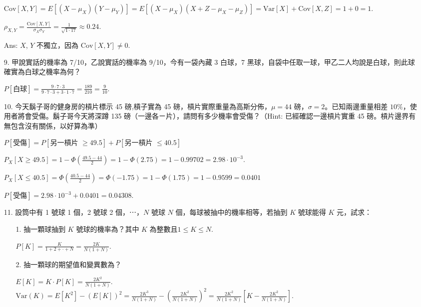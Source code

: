 \documentclass{article}
\begin{document}
\begin{enumerate}
    $\text{Cov}[X, Y] = E[(X - \mu_X)(Y - \mu_Y)] = E[(X - \mu_X)(X + Z - \mu_X - \mu_Z)] = \text{Var}[X] + \text{Cov}[X, Z] = 1 + 0 = 1.$

    $\rho_{X, Y} = \frac{\text{Cov}[X, Y]}{\sigma_X \sigma_Y} = \frac{1}{\sqrt{1 \cdot 17}} \approx 0.24.$

    Ans: $X$, $Y$ 不獨立，因為 $\text{Cov}[X, Y] \ne 0$.

    \item [9.] 甲說實話的機率為 7/10，乙說實話的機率為 9/10，今有一袋內藏 3 白球，7 黑球，自袋中任取一球，甲乙二人均說是白球，則此球確實為白球之機率為何？

    $P[\text{白球}] = \frac{9 \cdot 7 \cdot 3}{9 \cdot 7 \cdot 3 + 3 \cdot 1 \cdot 7} = \frac{189}{210} = \frac{9}{10}$.

    \item [10.] 今天鬍子哥的健身房的槓片標示 45 磅,槓子實為 45 磅，槓片實際重量為高斯分佈，$\mu = 44$ 磅，$\sigma = 2$。已知兩邊重量相差 $10\%$，使用者將會受傷。鬍子哥今天將深蹲 135 磅（一邊各ㄧ片），請問有多少機率會受傷？（Hint: 已經確認一邊槓片實重 45 磅。槓片邊界有無包含沒有關係，以好算為準）

    $P[\text{受傷}] = P[\text{另一槓片 $\ge 49.5$}] + P[\text{另一槓片 $\le 40.5$}]$

    $P_X[X \ge 49.5] = 1 - \Phi(\frac{49.5 - 44}{2}) = 1 - \Phi(2.75) = 1 - 0.99702 = 2.98 \cdot 10^{-3}$.

    $P_X[X \le 40.5] = \Phi(\frac{40.5 - 44}{2}) = \Phi(-1.75) = 1 - \Phi(1.75) = 1 - 0.9599 = 0.0401$

    $P[\text{受傷}] = 2.98 \cdot 10^{-3} + 0.0401 = 0.04308$.

    \item [11.] 設筒中有 1 號球 1 個，2 號球 2 個，⋯，$N$ 號球 $N$ 個，每球被抽中的機率相等，若抽到 $K$ 號球能得 $K$ 元，試求：
    
        \begin{enumerate}
            \item [1.] 抽一顆球抽到 $K$ 號球的機率為？其中 $K$ 為整數且$1 \le K \le N$.
            
            $P[K] = \frac{K}{1 + 2 + \cdot + N} = \frac{2K}{N(1 + N)}.$

            \item [2.] 抽一顆球的期望值和變異數為？
            
            $E[K] = K \cdot P[K] = \frac{2K^2}{N(1 + N)}.$ \\
                       $\text{Var}(K) = E[K^2] - (E[K])^2 = \frac{2K^3}{N(1 + N)} - (\frac{2K^2}{N(1 + N)})^2 = \frac{2K^2}{N(1 + N)}[K - \frac{2K^2}{N(1 + N)}].$ 
        \end{enumerate}


\end{enumerate}
\end{document}
